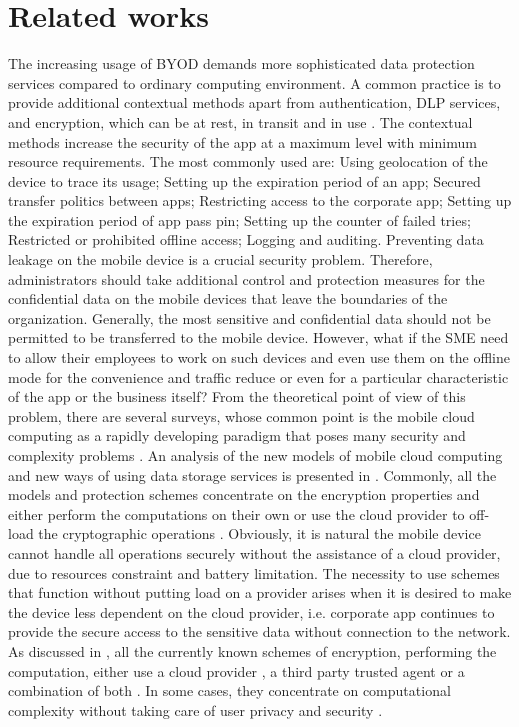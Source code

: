 \documentclass[twocolumn]{svjour3}          	%
\begin{document}
\section{Related works}
\label{sec_related_works}
The increasing usage of BYOD demands more sophisticated data protection services compared to ordinary computing environment. A common practice is to provide additional contextual methods apart from authentication, DLP services, and encryption, which can be at rest, in transit and in use \cite{yovel2014, khan2015cloud, khan2014survey, khan2013towards}. The contextual methods increase the security of the app at a maximum level with minimum resource requirements. The most commonly used are:
Using geolocation of the device to trace its usage;
Setting up the expiration period of an app;
Secured transfer politics between apps;
Restricting access to the corporate app;
Setting up the expiration period of app pass pin;
Setting up the counter of failed tries;
Restricted or prohibited offline access;
Logging and auditing.
Preventing data leakage on the mobile device is a crucial security problem. Therefore, administrators should take additional control and protection measures for the confidential data on the mobile devices that leave the boundaries of the organization. Generally, the most sensitive and confidential data should not be permitted to be transferred to the mobile device. However, what if the SME need to allow their employees to work on such devices and even use them on the offline mode for the convenience and traffic reduce or even for a particular characteristic of the app or the business itself?
From the theoretical point of view of this problem, there are several surveys, whose common point is the mobile cloud computing as a rapidly developing paradigm that poses many security and complexity problems \cite{yovel2014, khan2015cloud, khan2014survey, khan2013towards}. An analysis of the new models of mobile cloud computing and new ways of using data storage services is presented in \cite{khan2015cloud, khan2013towards}. Commonly, all the models and protection schemes concentrate on the encryption properties and either perform the computations on their own \cite{zhao2010trusted, yang2011provable} or use the cloud provider to off-load the cryptographic operations \cite{itani2010energy, ren2011lightweight}. Obviously, it is natural the mobile device cannot handle all operations securely without the assistance of a cloud provider, due to resources constraint and battery limitation.
The necessity to use schemes that function without putting load on a provider arises when it is desired to make the device less dependent on the cloud provider, i.e. corporate app continues to provide the secure access to the sensitive data without connection to the network. As discussed in \cite{khan2015cloud}, all the currently known schemes of encryption, performing the computation, either use a cloud provider \cite{zhao2010trusted}, a third party trusted agent \cite{yang2011provable} or a combination of both \cite{itani2010energy}. In some cases, they concentrate on computational complexity without taking care of user privacy and security \cite{ren2011lightweight}.
\end{document}
